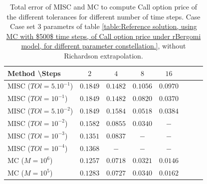 \documentclass[11pt]{article}
\begin{document}
\begin{table}[h!]
	\centering
	\begin{tabular}{l*{6}{c}r}
		Method \textbackslash  Steps            & $2$ & $4$ & $8$ & $16$  \\
		\hline
		MISC ($TOl=5.10^{-1}$)  & $\mathbf{0.1849}$ & $\mathbf{0.1482}$ & $\mathbf{ 0.1056}$ & $\mathbf{ 0.0970}$  \\
		MISC ($TOl=10^{-1}$)  & $\mathbf{0.1849}$ & $\mathbf{0.1482}$ & $\mathbf{ 0.0820}$ & $\mathbf{0.0370}$  \\
		MISC ($TOl=5.10^{-2}$)  &$\mathbf{0.1849}$ & $\mathbf{0.1584}$ & $\mathbf{0.0518}$ & $\mathbf{0.0384}$  \\
		MISC ($TOl=10^{-2}$)  & $\mathbf{0.1582}$ & $\mathbf{0.0855}$ & $\mathbf{0.0340}$ & $\mathbf{-}$  \\
		MISC ($TOl=10^{-3}$)  & $\mathbf{0.1351}$ & $\mathbf{0.0837}$ & $\mathbf{-}$ & $\mathbf{-}$  \\
		MISC ($TOl=10^{-4}$)  & $\mathbf{0.1368}$ & $\mathbf{-}$ & $\mathbf{-}$ & $\mathbf{-}$  \\
		\hline
		MC  ($M=10^6$)   & $\mathbf{  0.1257}$  & $\mathbf{0.0718}$  & $\mathbf{ 0.0321}$ & $\mathbf{   0.0146}$  \\	
		MC  ($M=10^5$)   & $\mathbf{  0.1283}$  & $\mathbf{0.0727}$  & $\mathbf{ 0.0340}$ & $\mathbf{   0.0162}$  \\	
		\hline
	\end{tabular}
	\caption{Total error of MISC and MC to compute Call option price of the different tolerances for different number of time steps. Case Case set $3$ parametrs of table \ref{table:Reference solution, using MC with $500$ time steps, of Call option price under rBergomi model, for different parameter constellation.}, without Richardson extrapolation.}
	\label{Total error of MISC and MC to compute Call option price of the different tolerances for different number of time steps. Case set 3, without Richardson extrapolation. The numbers between parentheses are the corresponding absolute errors.}
\end{table}
\end{document}

